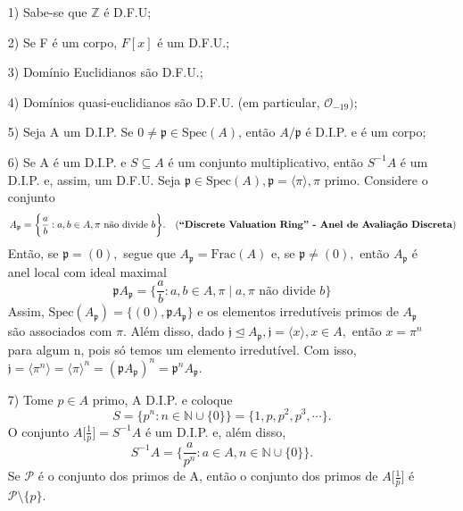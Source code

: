 \documentclass[algebraII_notes.tex]{subfiles}
\begin{document}
\begin{example}
	\begin{itemize}
		\item[1)] Sabe-se que \(\mathbb{Z}\) é D.F.U;
		\item[2)] Se F é um corpo, \(F[x]\) é um D.F.U.;
		\item[3)] Domínio Euclidianos são D.F.U.;
		\item[4)] Domínios quasi-euclidianos são D.F.U. (em particular, \(\mathcal{O}_{-19})\);
		\item[5)] Seja A um D.I.P. Se \(0\neq\mathfrak{p}\in \mathrm{Spec}(A)\), então \(A/\mathfrak{p}\) é D.I.P. e é um corpo;
		\item[6)] Se A é um D.I.P. e \(S\subseteq{A}\) é um conjunto multiplicativo, então \(S^{-1}A\) é um D.I.P. e, assim, um D.F.U. Seja \(\mathfrak{p}\in \mathrm{Spec}(A), \mathfrak{p} = \langle \pi  \rangle, \pi\) primo. Considere o conjunto
		      \[
			      A_{\mathfrak{p}} = \biggl\{\frac{a}{b}: a, b \in A, \pi \text{ não divide } b\biggr\}.\quad \text{(\textbf{``Discrete Valuation Ring'' - Anel de Avaliação Discreta})}
		      \]
		      Então, se \(\mathfrak{p} = (0),\) segue que \(A_{\mathfrak{p}} = \mathrm{Frac}(A)\) e, se \(\mathfrak{p}\neq (0),\) então
		      \(A_{\mathfrak{p}}\) é anel local com ideal maximal
		      \[
			      \mathfrak{p}A_{\mathfrak{p}} = \biggl\{\frac{a}{b}: a,b\in A, \pi \mid a, \pi \text{ não divide } b\biggr\}
		      \]
		      Assim, \(\mathrm{Spec}(A_{\mathfrak{p}}) = \{(0), \mathfrak{p}A_{\mathfrak{p}}\}\) e os elementos irredutíveis primos de \(A_{\mathfrak{p}}\)
		      são associados com \(\pi \). Além disso, dado \(\mathfrak{j}\trianglelefteq{A_{\mathfrak{p}}}, \mathfrak{j} = \langle x \rangle, x\in A,\) então
		      \(x = \pi ^{n}\) para algum n, pois só temos um elemento irredutível. Com isso, \(\mathfrak{j} = \langle \pi ^{n} \rangle = \langle \pi  \rangle^{n} = (\mathfrak{p}A_{\mathfrak{p}})^{n} = \mathfrak{p}^{n}A_{\mathfrak{p}}\).
		\item[7)] Tome \(p\in A\) primo, A D.I.P. e coloque
		      \[
			      S = \{p^{n}: n\in \mathbb{N}\cup \{0\}\} = \{1, p, p^{2}, p^{3}, \cdots\}.
		      \]
		      O conjunto \(A \biggl[\frac{1}{p}\biggr] = S^{-1}A\) é um D.I.P. e, além disso,
		      \[
			      S^{-1}A = \biggl\{\frac{a}{p^{n}}:a\in A, n\in \mathbb{N}\cup\{0\}\biggr\}.
		      \]
		      Se \(\mathcal{P}\) é o conjunto dos primos de A, então o conjunto dos primos de \(A \biggl[\frac{1}{p}\biggr]\) é
		      \(\mathcal{P}\setminus{\{p\}}\).
	\end{itemize}
\end{example}
\end{document}
